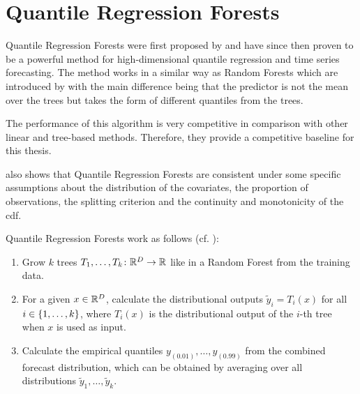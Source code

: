 \section{Quantile Regression Forests}
\label{sec:qrf}

Quantile Regression Forests were first proposed by \Textcite{Meinshausen2006}
and have since then proven to be a powerful method for high-dimensional quantile 
regression and time series forecasting. 
The method works in a similar way as Random Forests which are introduced by \Textcite{Breiman2001}
with the main difference 
being that the predictor is not the mean over the trees but takes the form of different quantiles 
from the trees.

The performance of this algorithm is very competitive in comparison with other 
linear and tree-based methods.
Therefore, they provide a competitive baseline for this thesis. 

\Textcite{Meinshausen2006} also shows that Quantile Regression Forests are consistent 
under some specific assumptions about the distribution of the covariates, the proportion of observations, the splitting criterion and the 
continuity and monotonicity of the \gls{cdf}.

Quantile Regression Forests work as follows (cf. \Textcite{Meinshausen2006}):
\begin{enumerate}
    \item Grow \(k\) trees \(T_1, \ldots, T_k\colon \mathbb{R}^D \rightarrow \mathbb{R}\) like in a Random Forest from the training data.
    \item For a given \(x\in\mathbb{R}^D\), calculate the distributional outputs \( \tilde{y}_i = T_i(x) \) for all \(i \in \{1, \ldots, k\}\), 
    where \(T_i(x)\) is the distributional output of the \(i\)-th tree when \(x\) is used as input.
    \item Calculate the empirical quantiles \(y_{(0.01)}, \ldots, y_{(0.99)}\) from the 
    combined forecast distribution, which can be obtained by averaging over all distributions 
    \(\tilde{y}_1, \ldots, \tilde{y}_k\).
\end{enumerate}